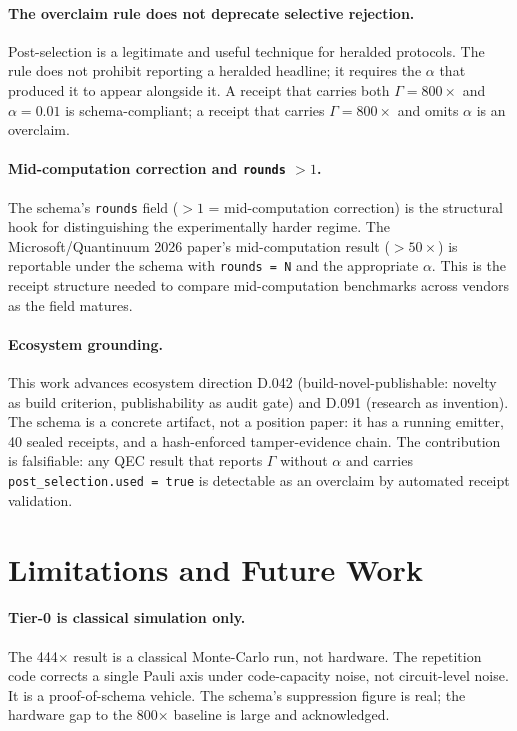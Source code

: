\documentclass[conference]{IEEEtran}
\newcommand{\af}{\alpha}            %
\newcommand{\suppfactor}{\Gamma}    %
\begin{document}
\paragraph{The overclaim rule does not deprecate selective rejection.}
Post-selection is a legitimate and useful technique for heralded
protocols. The rule does not prohibit reporting a heralded headline;
it requires the $\af$ that produced it to appear alongside it. A receipt
that carries both $\suppfactor{=}800\times$ and $\af{=}0.01$ is
schema-compliant; a receipt that carries $\suppfactor{=}800\times$ and
omits $\af$ is an overclaim.

\paragraph{Mid-computation correction and \texttt{rounds} $> 1$.}
The schema's \texttt{rounds} field ($> 1$ = mid-computation correction)
is the structural hook for distinguishing the experimentally harder
regime. The Microsoft/Quantinuum 2026 paper's mid-computation result
($> 50\times$) is reportable under the schema with \texttt{rounds = N}
and the appropriate $\af$. This is the receipt structure needed to
compare mid-computation benchmarks across vendors as the field matures.

\paragraph{Ecosystem grounding.}
This work advances ecosystem direction D.042 (build-novel-publishable:
novelty as build criterion, publishability as audit gate) and D.091
(research as invention). The schema is a concrete artifact, not a
position paper: it has a running emitter, 40 sealed receipts, and a
hash-enforced tamper-evidence chain. The contribution is falsifiable:
any QEC result that reports $\suppfactor$ without $\af$ and carries
\texttt{post\_selection.used = true} is detectable as an overclaim by
automated receipt validation.

\section{Limitations and Future Work}
\label{sec:limitations}

\paragraph{Tier-0 is classical simulation only.}
The 444$\times$ result is a classical Monte-Carlo run, not hardware. The
repetition code corrects a single Pauli axis under code-capacity noise,
not circuit-level noise. It is a proof-of-schema vehicle. The schema's
suppression figure is real; the hardware gap to the 800$\times$ baseline
is large and acknowledged.
\end{document}
